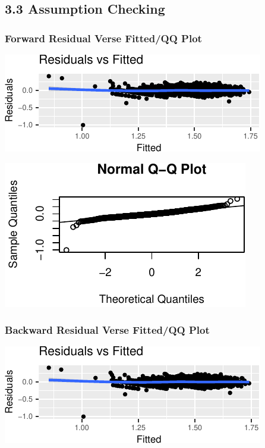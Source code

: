 \documentclass[letterpaper,9pt,twocolumn,twoside,]{pinp}
\begin{document}
\subsection{3.3 Assumption Checking}\label{assumption-checking}

\subsubsection{Forward Residual Verse Fitted/QQ
Plot}\label{forward-residual-verse-fittedqq-plot}

\begin{center}\includegraphics{ExecSum_files/figure-latex/unnamed-chunk-4-1} \end{center}

\begin{center}\includegraphics{ExecSum_files/figure-latex/unnamed-chunk-5-1} \end{center}

\subsubsection{Backward Residual Verse Fitted/QQ
Plot}\label{backward-residual-verse-fittedqq-plot}

\begin{center}\includegraphics[width=0.5\linewidth]{ExecSum_files/figure-latex/unnamed-chunk-6-1} \end{center}
\end{document}
